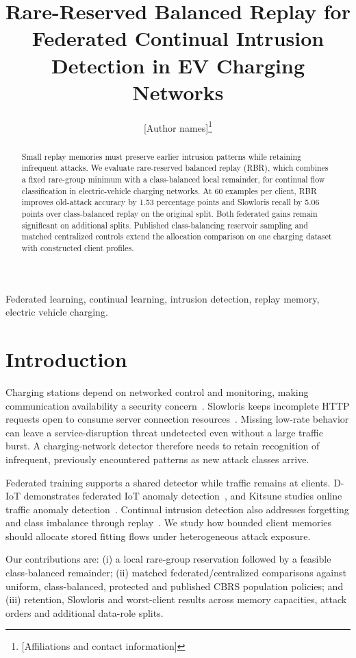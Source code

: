 \documentclass[journal,10pt]{IEEEtran}
\title{Rare-Reserved Balanced Replay for Federated Continual Intrusion Detection in EV Charging Networks}
\author{[Author names]\thanks{[Affiliations and contact information]}}
\begin{document}
\maketitle
\begin{abstract}
Small replay memories must preserve earlier intrusion patterns while retaining infrequent attacks. We evaluate rare-reserved balanced replay (RBR), which combines a fixed rare-group minimum with a class-balanced local remainder, for continual flow classification in electric-vehicle charging networks. At 60 examples per client, RBR improves old-attack accuracy by 1.53 percentage points and Slowloris recall by 5.06 points over class-balanced replay on the original split. Both federated gains remain significant on additional splits. Published class-balancing reservoir sampling and matched centralized controls extend the allocation comparison on one charging dataset with constructed client profiles.
\end{abstract}
\begin{IEEEkeywords}
Federated learning, continual learning, intrusion detection, replay memory, electric vehicle charging.
\end{IEEEkeywords}
\section{Introduction}
Charging stations depend on networked control and monitoring, making communication availability a security concern~\cite{ocpp,dataset}. Slowloris keeps incomplete HTTP requests open to consume server connection resources~\cite{slowloris}. Missing low-rate behavior can leave a service-disruption threat undetected even without a large traffic burst. A charging-network detector therefore needs to retain recognition of infrequent, previously encountered patterns as new attack classes arrive.

Federated training supports a shared detector while traffic remains at clients. D-IoT demonstrates federated IoT anomaly detection~\cite{diot}, and Kitsune studies online traffic anomaly detection~\cite{kitsune}. Continual intrusion detection also addresses forgetting and class imbalance through replay~\cite{amr}. We study how bounded client memories should allocate stored fitting flows under heterogeneous attack exposure.

Our contributions are: (i) a local rare-group reservation followed by a feasible class-balanced remainder; (ii) matched federated/centralized comparisons against uniform, class-balanced, protected and published CBRS population policies; and (iii) retention, Slowloris and worst-client results across memory capacities, attack orders and additional data-role splits.
\end{document}
